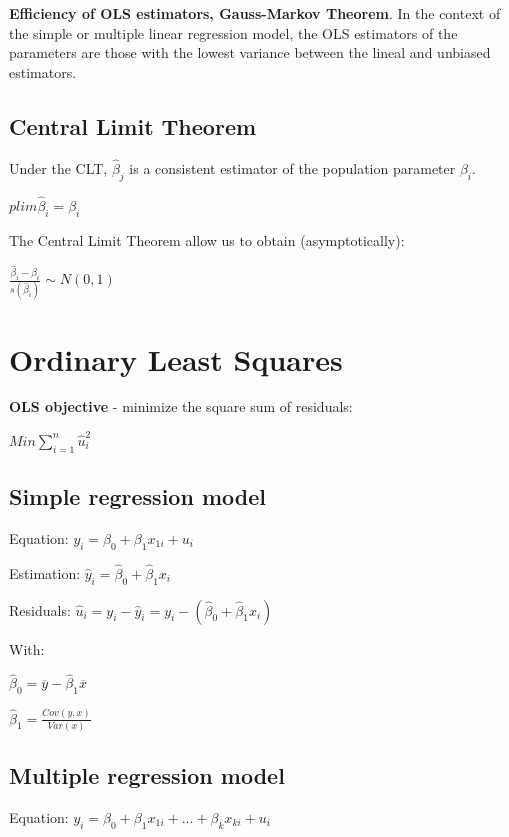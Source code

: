 \documentclass[10pt,landscape]{article}
\begin{document}
\begin{multicols}{3}
\textbf{Efficiency of OLS estimators, Gauss-Markov Theorem}. In the context of the simple or multiple linear regression model, the OLS estimators of the parameters are those with the lowest variance between the lineal and unbiased estimators.

\subsection*{Central Limit Theorem}
Under the CLT, $\hat{\beta}_j$ is a consistent estimator of the population parameter $\beta_i$.

$p lim \hat{\beta}_i = \beta_i$

The Central Limit Theorem allow us to obtain (asymptotically):

$\frac{\hat{\beta}_i - \beta_i}{s(\hat{\beta}_i)} \sim N(0,1)$

\section*{Ordinary Least Squares}


\textbf{OLS objective} - minimize the square sum of residuals:

$Min \sum_{i=1}^n \hat{u}_i^2$

\subsection*{Simple regression model}

Equation: $y_i = \beta_0 + \beta_1 x_{1i} + u_i$

Estimation: $\hat{y}_i = \hat{\beta}_0 + \hat{\beta}_1 x_i$

Residuals: $\hat{u}_i = y_i - \hat{y}_i = y_i - (\hat{\beta}_0 + \hat{\beta}_1 x_i)$

With:

$\hat{\beta}_0 = \overline{y} - \hat{\beta}_1 \overline{x}$

$\hat{\beta}_1 = \frac{Cov(y, x)}{Var(x)}$

\subsection*{Multiple regression model}

Equation: $y_i = \beta_0 + \beta_1 x_{1i} + ... + \beta_k x_{ki} + u_i$


\end{multicols}
\end{document}

